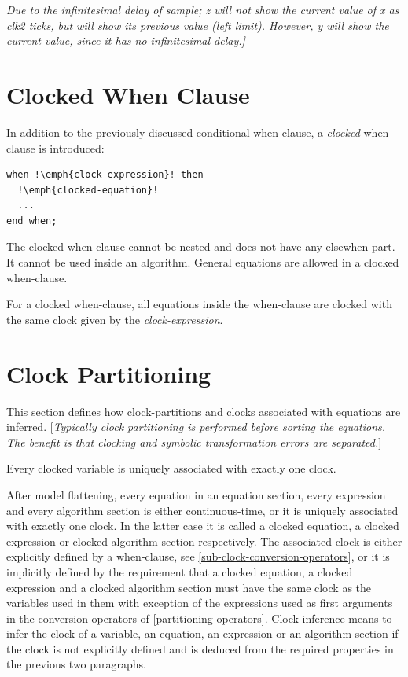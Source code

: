 \documentclass[10pt,a4paper]{report}
\def\doublelabel#1{\label{#1}}
\begin{document}
\emph{Due to the infinitesimal delay of sample; z will not show the
current value of x as clk2 ticks, but will show its previous value (left
limit). However, y will show the current value, since it has no
infinitesimal delay.{]}}

\section{Clocked When Clause}\doublelabel{clocked-when-clause}

In addition to the previously discussed conditional when-clause, a
\emph{clocked} when-clause is introduced:
\begin{lstlisting}[language=modelica,escapechar=!]
when !\emph{clock-expression}! then
  !\emph{clocked-equation}!
  ...
end when;
\end{lstlisting}

The clocked when-clause cannot be nested and does not have any elsewhen
part. It cannot be used inside an algorithm. General equations are
allowed in a clocked when-clause.

For a clocked when-clause, all equations inside the when-clause are
clocked with the same clock given by the \emph{clock-expression}.

\section{Clock Partitioning}\doublelabel{clock-partitioning}

This section defines how clock-partitions and clocks associated with
equations are inferred. {[}\emph{Typically clock partitioning is
performed before sorting the equations. The benefit is that clocking and
symbolic transformation errors are separated.}{]}

Every clocked variable is uniquely associated with exactly one clock.

After model flattening, every equation in an equation section, every
expression and every algorithm section is either continuous-time, or it
is uniquely associated with exactly one clock. In the latter case it is
called a clocked equation, a clocked expression or clocked algorithm
section respectively. The associated clock is either explicitly defined
by a when-clause, see \ref{sub-clock-conversion-operators}, or it is implicitly defined by the
requirement that a clocked equation, a clocked expression and a clocked
algorithm section must have the same clock as the variables used in them
with exception of the expressions used as first arguments in the
conversion operators of \ref{partitioning-operators}. Clock inference means to infer the
clock of a variable, an equation, an expression or an algorithm section
if the clock is not explicitly defined and is deduced from the required
properties in the previous two paragraphs.
\end{document}
